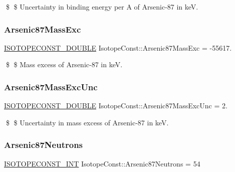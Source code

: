 \$ \$ Uncertainty in binding energy per A of Arsenic-\/87 in keV. \mbox{\label{group___isotope_const-_arsenic-_as87_gac2390a47c051b56450f92bcce052abe8}} 
\subsubsection{\texorpdfstring{Arsenic87\+Mass\+Exc}{Arsenic87MassExc}}
{\footnotesize\ttfamily \mbox{\hyperlink{group___isotope_const-_macros_ga8f45a7272ce02c0b4c65c44636ed719a}{I\+S\+O\+T\+O\+P\+E\+C\+O\+N\+S\+T\+\_\+\+D\+O\+U\+B\+LE}} Isotope\+Const\+::\+Arsenic87\+Mass\+Exc = -\/55617.}

\$ \$ Mass excess of Arsenic-\/87 in keV. \mbox{\label{group___isotope_const-_arsenic-_as87_ga23cc9e04547da15e9c946d48afcfa07e}} 
\subsubsection{\texorpdfstring{Arsenic87\+Mass\+Exc\+Unc}{Arsenic87MassExcUnc}}
{\footnotesize\ttfamily \mbox{\hyperlink{group___isotope_const-_macros_ga8f45a7272ce02c0b4c65c44636ed719a}{I\+S\+O\+T\+O\+P\+E\+C\+O\+N\+S\+T\+\_\+\+D\+O\+U\+B\+LE}} Isotope\+Const\+::\+Arsenic87\+Mass\+Exc\+Unc = 2.}

\$ \$ Uncertainty in mass excess of Arsenic-\/87 in keV. \mbox{\label{group___isotope_const-_arsenic-_as87_ga909cc82bd9a37b38618f65f01b3d8ae9}} 
\subsubsection{\texorpdfstring{Arsenic87\+Neutrons}{Arsenic87Neutrons}}
{\footnotesize\ttfamily \mbox{\hyperlink{group___isotope_const-_macros_ga5f18360b3e99483a35c32d789e62621c}{I\+S\+O\+T\+O\+P\+E\+C\+O\+N\+S\+T\+\_\+\+I\+NT}} Isotope\+Const\+::\+Arsenic87\+Neutrons = 54}

